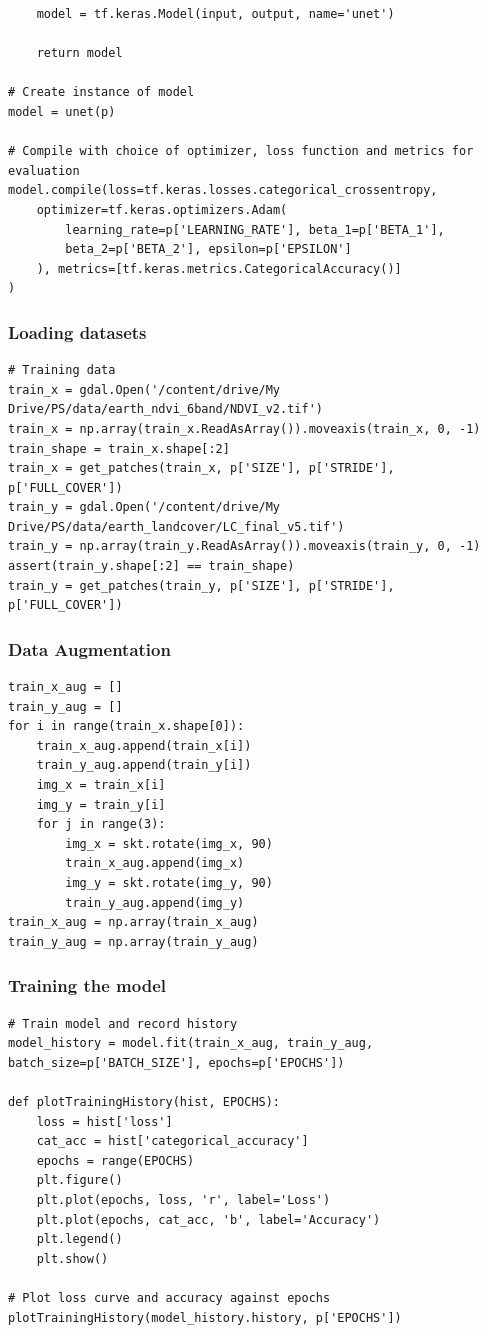 \documentclass[12pt, a4paper]{report}
\begin{document}
\begin{verbatim}
    model = tf.keras.Model(input, output, name='unet')

    return model

# Create instance of model
model = unet(p)

# Compile with choice of optimizer, loss function and metrics for evaluation
model.compile(loss=tf.keras.losses.categorical_crossentropy,
	optimizer=tf.keras.optimizers.Adam(
		learning_rate=p['LEARNING_RATE'], beta_1=p['BETA_1'], 
		beta_2=p['BETA_2'], epsilon=p['EPSILON']
	), metrics=[tf.keras.metrics.CategoricalAccuracy()]
)
\end{verbatim}

\subsubsection*{Loading datasets}
\begin{verbatim}
# Training data
train_x = gdal.Open('/content/drive/My Drive/PS/data/earth_ndvi_6band/NDVI_v2.tif')
train_x = np.array(train_x.ReadAsArray()).moveaxis(train_x, 0, -1)
train_shape = train_x.shape[:2]
train_x = get_patches(train_x, p['SIZE'], p['STRIDE'], p['FULL_COVER'])
train_y = gdal.Open('/content/drive/My Drive/PS/data/earth_landcover/LC_final_v5.tif')
train_y = np.array(train_y.ReadAsArray()).moveaxis(train_y, 0, -1)
assert(train_y.shape[:2] == train_shape)
train_y = get_patches(train_y, p['SIZE'], p['STRIDE'], p['FULL_COVER'])
\end{verbatim}
\subsubsection*{Data Augmentation}
\begin{verbatim}
train_x_aug = []
train_y_aug = []
for i in range(train_x.shape[0]):
    train_x_aug.append(train_x[i])
    train_y_aug.append(train_y[i])
    img_x = train_x[i]
    img_y = train_y[i]
    for j in range(3):
        img_x = skt.rotate(img_x, 90)
        train_x_aug.append(img_x)
        img_y = skt.rotate(img_y, 90)
        train_y_aug.append(img_y)
train_x_aug = np.array(train_x_aug)
train_y_aug = np.array(train_y_aug)
\end{verbatim}
\subsubsection*{Training the model}
\begin{verbatim}
# Train model and record history
model_history = model.fit(train_x_aug, train_y_aug, batch_size=p['BATCH_SIZE'], epochs=p['EPOCHS'])

def plotTrainingHistory(hist, EPOCHS):
    loss = hist['loss']
    cat_acc = hist['categorical_accuracy']
    epochs = range(EPOCHS)
    plt.figure()
    plt.plot(epochs, loss, 'r', label='Loss')
    plt.plot(epochs, cat_acc, 'b', label='Accuracy')
    plt.legend()
    plt.show()

# Plot loss curve and accuracy against epochs
plotTrainingHistory(model_history.history, p['EPOCHS'])
\end{verbatim}
\end{document}
